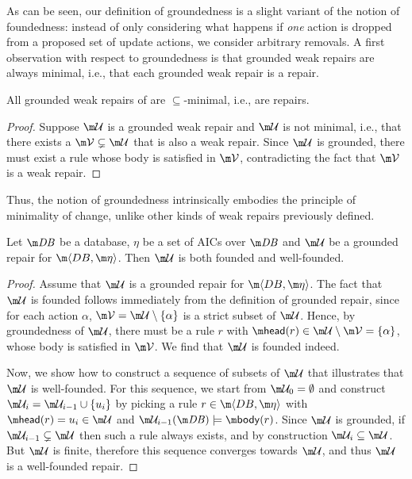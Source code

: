 As can be seen, our definition of groundedness is a slight variant of the notion of foundedness: instead of only considering what happens if \emph{one} action is dropped from a proposed set of update actions, we consider arbitrary removals. 
A first observation with respect to groundedness is that grounded weak repairs are always minimal, i.e., that each grounded weak repair is a repair. 
\begin{proposition}
 All grounded weak repairs of \fulldb are $\subseteq$-minimal, i.e., are repairs. 
\end{proposition}
\begin{proof}
 Suppose $\UU$ is a grounded weak repair and $\UU$ is not minimal, i.e., that there exists a $\VV\subsetneq \UU$ that is also a weak repair. 
 Since $\UU$ is grounded, there must exist a rule whose body is satisfied in $\VV$, contradicting the fact  that $\VV$ is a weak repair. 
\end{proof}
Thus, the notion of groundedness intrinsically embodies the principle of minimality of change, unlike other kinds of weak repairs previously defined.


\begin{proposition}
  \label{prop:founded}
  Let $\db$ be a database, $\eta$ be a set of AICs over $\db$ and $\UU$ be a grounded repair for $\fulldb$.
  Then $\UU$ is both founded and well-founded.
\end{proposition}
\begin{proof}
  Assume that $\UU$ is a grounded repair for $\fulldb$.
  The fact that $\UU$ is founded follows immediately from the definition of grounded repair, since for each action $\alpha$, $\VV=\UU\setminus\{\alpha\}$ is a strict subset of $\UU$. Hence, by groundedness of $\UU$, there must be a rule $r$ with $\head(r)\in \UU\setminus \VV=\{\alpha\}$, whose body is satisfied in $\VV$. We find that $\UU$ is founded indeed. %
  
  Now, we show how to construct a sequence of subsets of $\UU$ that illustrates that $\UU$ is well-founded. 
  For this sequence, we start from $\UU_0=\emptyset$ and construct $\UU_i=\UU_{i-1}\cup\{u_i\}$ by picking a rule $r\in \fulldb$ with $\head(r)=u_i\in\UU$ and $\UU_{i-1}(\db)\models \body(r)$.
  Since $\UU$ is grounded, if $\UU_{i-1}\subsetneq\UU$ then such a rule always exists,
  and by construction $\UU_i\subseteq\UU$.
  But $\UU$ is finite, therefore this sequence converges towards $\UU$, and thus $\UU$ is a well-founded repair.
\end{proof}

